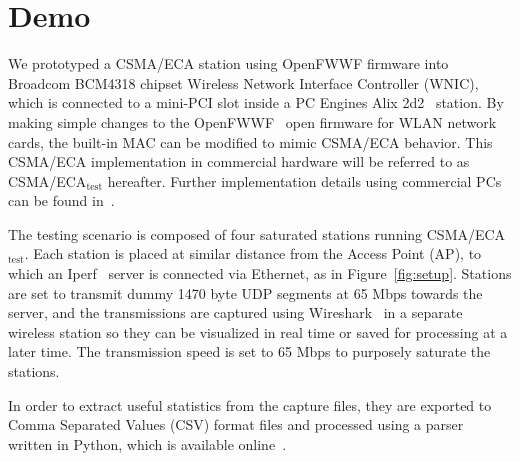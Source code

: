 \documentclass[conference]{IEEEtran}
\begin{document}
\section{Demo}\label{prototype}

We prototyped a CSMA/ECA station using OpenFWWF firmware into Broadcom BCM4318 chipset Wireless Network Interface Controller (WNIC), which is connected to a mini-PCI slot inside a PC Engines Alix 2d2~\cite{Alix2d2} station. By making simple changes to the OpenFWWF~\cite{OpenFWWF} open firmware for WLAN network cards, the built-in MAC can be modified to mimic CSMA/ECA behavior. This CSMA/ECA implementation in commercial hardware will be referred to as CSMA/ECA$_{\text{test}}$ hereafter. Further implementation details using commercial PCs can be found in~\cite{BECA-test}.

	The testing scenario is composed of four saturated stations running CSMA/ECA$_{\text{test}}$. Each station is placed at similar distance from the Access Point (AP), to which an Iperf~\cite{tirumala2005iperf} server is connected via Ethernet, as in Figure~\ref{fig:setup}. Stations are set to transmit dummy 1470 byte UDP segments at 65 Mbps towards the server, and the transmissions are captured using Wireshark~\cite{combs2007wireshark} in a separate wireless station so they can be visualized in real time or saved for processing at a later time. The transmission speed is set to 65 Mbps to purposely saturate the stations.
	
	In order to extract useful statistics from the capture files, they are exported to Comma Separated Values (CSV) format files and processed using a parser written in Python, which is available online~\cite{pcapParser}.
	
\end{document}
